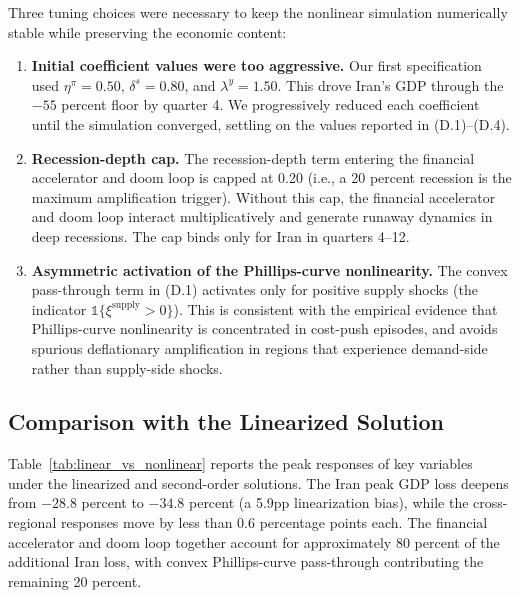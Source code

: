 \documentclass[12pt,a4paper]{article}
\begin{document}
Three tuning choices were necessary to keep the nonlinear simulation numerically stable while preserving the economic content:
\begin{enumerate}[itemsep=2pt, topsep=2pt]
    \item \textbf{Initial coefficient values were too aggressive.} Our first specification used $\eta^\pi = 0.50$, $\delta^s = 0.80$, and $\lambda^y = 1.50$. This drove Iran's GDP through the $-55$ percent floor by quarter 4. We progressively reduced each coefficient until the simulation converged, settling on the values reported in (D.1)--(D.4).
    \item \textbf{Recession-depth cap.} The recession-depth term entering the financial accelerator and doom loop is capped at 0.20 (i.e., a 20 percent recession is the maximum amplification trigger). Without this cap, the financial accelerator and doom loop interact multiplicatively and generate runaway dynamics in deep recessions. The cap binds only for Iran in quarters 4--12.
    \item \textbf{Asymmetric activation of the Phillips-curve nonlinearity.} The convex pass-through term in (D.1) activates only for positive supply shocks (the indicator $\mathbb{1}\{\xi^{\text{supply}} > 0\}$). This is consistent with the empirical evidence that Phillips-curve nonlinearity is concentrated in cost-push episodes, and avoids spurious deflationary amplification in regions that experience demand-side rather than supply-side shocks.
\end{enumerate}

\subsection{Comparison with the Linearized Solution}

Table~\ref{tab:linear_vs_nonlinear} reports the peak responses of key variables under the linearized and second-order solutions. The Iran peak GDP loss deepens from $-28.8$ percent to $-34.8$ percent (a 5.9pp linearization bias), while the cross-regional responses move by less than 0.6 percentage points each. The financial accelerator and doom loop together account for approximately 80 percent of the additional Iran loss, with convex Phillips-curve pass-through contributing the remaining 20 percent.
\end{document}
